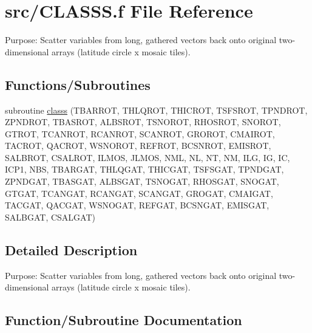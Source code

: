 \hypertarget{CLASSS_8f}{}\section{src/\+C\+L\+A\+S\+S\+S.f File Reference}
\label{CLASSS_8f}


Purpose\+: Scatter variables from long, gathered vectors back onto original two-\/dimensional arrays (latitude circle x mosaic tiles).  


\subsection*{Functions/\+Subroutines}
\begin{DoxyCompactItemize}
\item 
subroutine \hyperlink{CLASSS_8f_a3814fc276d21467a86f856186dd5d938}{classs} (T\+B\+A\+R\+R\+O\+T, T\+H\+L\+Q\+R\+O\+T, T\+H\+I\+C\+R\+O\+T, T\+S\+F\+S\+R\+O\+T, T\+P\+N\+D\+R\+O\+T, Z\+P\+N\+D\+R\+O\+T, T\+B\+A\+S\+R\+O\+T, A\+L\+B\+S\+R\+O\+T, T\+S\+N\+O\+R\+O\+T, R\+H\+O\+S\+R\+O\+T, S\+N\+O\+R\+O\+T, G\+T\+R\+O\+T, T\+C\+A\+N\+R\+O\+T, R\+C\+A\+N\+R\+O\+T, S\+C\+A\+N\+R\+O\+T, G\+R\+O\+R\+O\+T, C\+M\+A\+I\+R\+O\+T, T\+A\+C\+R\+O\+T, Q\+A\+C\+R\+O\+T, W\+S\+N\+O\+R\+O\+T, R\+E\+F\+R\+O\+T, B\+C\+S\+N\+R\+O\+T, E\+M\+I\+S\+R\+O\+T, S\+A\+L\+B\+R\+O\+T, C\+S\+A\+L\+R\+O\+T, I\+L\+M\+O\+S, J\+L\+M\+O\+S, N\+M\+L, N\+L, N\+T, N\+M, I\+L\+G, I\+G, I\+C, I\+C\+P1, N\+B\+S, T\+B\+A\+R\+G\+A\+T, T\+H\+L\+Q\+G\+A\+T, T\+H\+I\+C\+G\+A\+T, T\+S\+F\+S\+G\+A\+T, T\+P\+N\+D\+G\+A\+T, Z\+P\+N\+D\+G\+A\+T, T\+B\+A\+S\+G\+A\+T, A\+L\+B\+S\+G\+A\+T, T\+S\+N\+O\+G\+A\+T, R\+H\+O\+S\+G\+A\+T, S\+N\+O\+G\+A\+T, G\+T\+G\+A\+T, T\+C\+A\+N\+G\+A\+T, R\+C\+A\+N\+G\+A\+T, S\+C\+A\+N\+G\+A\+T, G\+R\+O\+G\+A\+T, C\+M\+A\+I\+G\+A\+T, T\+A\+C\+G\+A\+T, Q\+A\+C\+G\+A\+T, W\+S\+N\+O\+G\+A\+T, R\+E\+F\+G\+A\+T, B\+C\+S\+N\+G\+A\+T, E\+M\+I\+S\+G\+A\+T, S\+A\+L\+B\+G\+A\+T, C\+S\+A\+L\+G\+A\+T)
\end{DoxyCompactItemize}


\subsection{Detailed Description}
Purpose\+: Scatter variables from long, gathered vectors back onto original two-\/dimensional arrays (latitude circle x mosaic tiles). 



\subsection{Function/\+Subroutine Documentation}
\hypertarget{CLASSS_8f_a3814fc276d21467a86f856186dd5d938}{}
